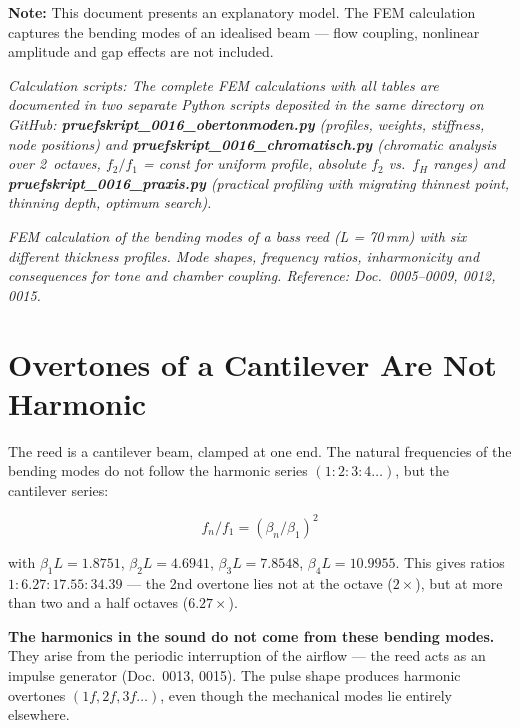 \documentclass[11pt,a4paper]{article}
\begin{document}
\hbmaketitle
\begin{tcolorbox}[colframe=red!60!black, colback=red!5!white]
\textbf{Note:} This document presents an explanatory model.
The FEM calculation captures the bending modes of an idealised beam ---
flow coupling, nonlinear amplitude and gap effects are not included.
\end{tcolorbox}

\noindent\textit{\small Calculation scripts: The complete FEM calculations with all tables
are documented in two separate Python scripts deposited in the same directory
on GitHub:
\textbf{pruefskript\_0016\_obertonmoden.py} (profiles, weights, stiffness, node positions)
and \textbf{pruefskript\_0016\_chromatisch.py} (chromatic analysis over 2~octaves,
$f_2/f_1$ = const for uniform profile, absolute $f_2$ vs.\ $f_H$ ranges)
and \textbf{pruefskript\_0016\_praxis.py} (practical profiling with migrating
thinnest point, thinning depth, optimum search).}

\noindent\textit{FEM calculation of the bending modes of a bass reed (L = 70\,mm) with
six different thickness profiles. Mode shapes, frequency ratios,
inharmonicity and consequences for tone and chamber coupling.
Reference: Doc.~0005--0009, 0012, 0015.}

\section{Overtones of a Cantilever Are Not Harmonic}

The reed is a cantilever beam, clamped at one end.
The natural frequencies of the bending modes do not follow the harmonic series
$(1:2:3:4\ldots)$, but the cantilever series:

\begin{equation}
f_n / f_1 = (\beta_n / \beta_1)^2
\end{equation}

with $\beta_1 L = 1{.}8751$, $\beta_2 L = 4{.}6941$, $\beta_3 L = 7{.}8548$,
$\beta_4 L = 10{.}9955$. This gives ratios $1 : 6{.}27 : 17{.}55 : 34{.}39$ ---
the 2nd overtone lies not at the octave ($2\times$), but at more than
two and a half octaves ($6{.}27\times$).

\begin{tcolorbox}[colframe=keygreen, colback=green!5!white]
\textbf{The harmonics in the sound do not come from these bending modes.}
They arise from the periodic interruption of the airflow --- the reed
acts as an impulse generator (Doc.~0013, 0015). The pulse shape produces harmonic
overtones $(1f, 2f, 3f\ldots)$, even though the mechanical modes lie entirely elsewhere.
\end{tcolorbox}
\end{document}
